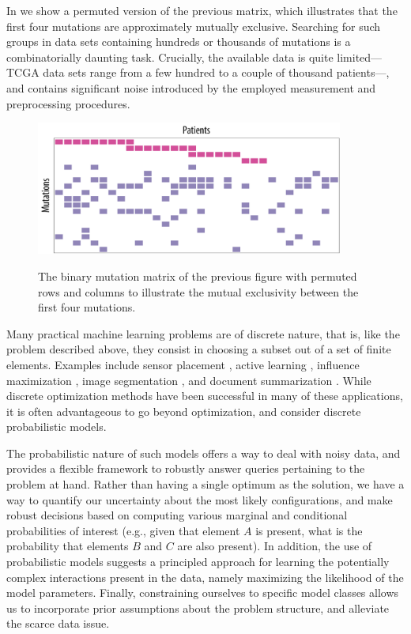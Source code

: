 In  we show a permuted version of the previous matrix, which illustrates that the first four mutations are approximately mutually exclusive.
Searching for such groups in data sets containing hundreds or thousands of mutations is a combinatorially daunting task.
Crucially, the available data is quite limited---TCGA data sets range from a few hundred to a couple of thousand patients---, and contains significant noise introduced by the employed measurement and preprocessing procedures.

\begin{figure}[tb]
\centering
\includegraphics[width=0.9\textwidth]{figures/intro/example1_rep.pdf}\\[1em]
\caption{The binary mutation matrix of the previous figure with permuted rows and columns to illustrate the mutual exclusivity between the first four mutations.}
\label{fig:bamat_2}
\end{figure}

Many practical machine learning problems are of discrete nature, that is, like the problem described above, they consist in choosing a subset out of a set of finite elements.
Examples include sensor placement \citep{krause06}, active learning \citep{golovin11}, influence maximization \citep{kempe03}, image segmentation \citep{jegelka11}, and document summarization \citep{lin11}.
While discrete optimization methods have been successful in many of these applications, it is often advantageous to go beyond optimization, and consider discrete probabilistic models.

The probabilistic nature of such models offers a way to deal with noisy data, and provides a flexible framework to robustly answer queries pertaining to the problem at hand.
Rather than having a single optimum as the solution, we have a way to quantify our uncertainty about the most likely configurations, and make robust decisions based on computing various marginal and conditional probabilities of interest (e.g., given that element $A$ is present, what is the probability that elements $B$ and $C$ are also present).
In addition, the use of probabilistic models suggests a principled approach for learning the potentially complex interactions present in the data, namely maximizing the likelihood of the model parameters.
Finally, constraining ourselves to specific model classes allows us to incorporate prior assumptions about the problem structure, and alleviate the scarce data issue.

